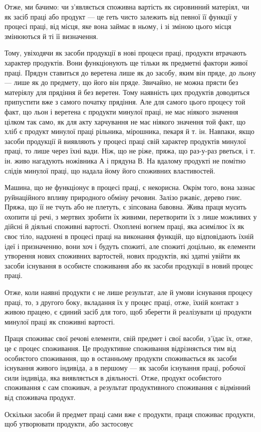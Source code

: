Отже, ми бачимо: чи з’являється споживна вартість як сировинний
матеріял, чи як засіб праці або продукт — це геть чисто
залежить від певної її функції у процесі праці, від місця, яке
вона займає в ньому, і зі зміною цього місця змінюються й ті
її визначення.

Тому, увіходячи як засоби продукції в нові процеси праці,
продукти втрачають характер продуктів. Вони функціонують
ще тільки як предметні фактори живої праці. Прядун ставиться
до веретена лише як до засобу, яким він пряде, до льону — лише
як до предмету, що його він пряде. Звичайно, не можна прясти
без матеріялу для прядіння й без веретен. Тому наявність цих
продуктів доводиться припустити вже з самого початку прядіння.
Але для самого цього процесу той факт, що льон і веретена є
продукти минулої праці, не має ніякого значення цілком так
само, як для акту харчування не має ніякого значення той факт,
що хліб є продукт минулої праці рільника, мірошника, пекаря
й т. ін. Навпаки, якщо засоби продукції й виявляють у процесі
праці свій характер продуктів минулої праці, то лише через їхні
вади. Ніж, що не ріже, пряжа, що раз-у-раз рветься, і т. ін.
живо нагадують ножівника А і прядуна В. На вдалому продукті
не помітно слідів минулої праці, що надала йому його споживних
властивостей.

Машина, що не функціонує в процесі праці, є некорисна.
Окрім того, вона зазнає руйнаційного впливу природного обміну
речовин. Залізо ржавіє, дерево гниє. Пряжа, що її не тчуть або
не плетуть, є зіпсована бавовна. Жива праця мусить охопити
ці речі, з мертвих зробити їх живими, перетворити їх з лише
можливих у дійсні й діяльні споживні вартості. Охоплені вогнем
праці, яка асимілює їх як своє тіло, надхнені в процесі праці на виконання
функцій, що відповідають їхній ідеї і призначенню, вони
хоч і будуть спожиті, але спожиті доцільно, як елементи утворення
нових споживних вартостей, нових продуктів, які здатні
увійти як засоби існування в особисте споживання або як засоби
продукції в новий процес праці.

Отже, коли наявні продукти є не лише результат, але й умови
існування процесу праці, то, з другого боку, вкладання їх у
процес праці, отже, їхній контакт з живою працею, є єдиний
засіб для того, щоб зберегти й реалізувати ці продукти минулої
праці як споживні вартості.

Праця споживає свої речові елементи, свій предмет і свої
васоби, з’їдає їх, отже, це є процес споживання. Це продуктивне
споживання відрізняється тим від особистого споживання, що в
останньому продукти споживається як засоби існування живого
індивіда, а в першому — як засоби існування праці, робочої
сили індивіда, яка виявляється в діяльності. Отже, продукт особистого
споживання є сам споживач, а результат продуктивного
споживання є відмінний від споживача продукт.

Оскільки засоби й предмет праці сами вже є продукти, праця
споживає продукти, щоб утворювати продукти, або застосовує
